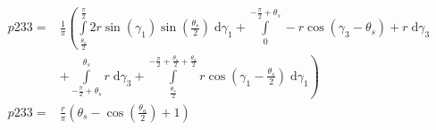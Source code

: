 \begin{align}
    p233 =&\frac{1}{\pi} \left(\int\limits_{\frac{\theta_{s}}{2}}^{\frac{\pi}{2}}2 r \sin{\left (\gamma_{1} \right )} \sin{\left (\frac{\theta_{s}}{2} \right )}\;\mathrm{d}\gamma_{1}+\int\limits_{0}^{- \frac{\pi}{2} + \theta_{s}}- r \cos{\left (\gamma_{3} - \theta_{s} \right )} + r\;\mathrm{d}\gamma_{3}\right.\\
 &\left.+\int\limits_{- \frac{\pi}{2} + \theta_{s}}^{\theta_{s}}r\;\mathrm{d}\gamma_{3}+\int\limits_{\frac{\theta_{s}}{2}}^{- \frac{\pi}{2} + \frac{\theta_{s}}{2} + \frac{\theta_{a}}{2}}r \cos{\left (\gamma_{1} - \frac{\theta_{s}}{2} \right )}\;\mathrm{d}\gamma_{1}\right)\\
    p233 =& \frac{r}{\pi} \left(\theta_{s} - \cos{\left (\frac{\theta_{a}}{2} \right )} + 1\right)
\end{align}